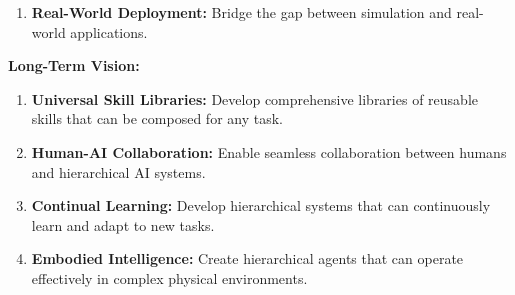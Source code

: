 \documentclass[12pt]{article}
\begin{document}
{{\begin{enumerate}
    \item \textbf{Real-World Deployment:} Bridge the gap between simulation and real-world applications.
\end{enumerate}

\textbf{Long-Term Vision:}
    \begin{enumerate}
    \item \textbf{Universal Skill Libraries:} Develop comprehensive libraries of reusable skills that can be composed for any task.
    
    \item \textbf{Human-AI Collaboration:} Enable seamless collaboration between humans and hierarchical AI systems.
    
    \item \textbf{Continual Learning:} Develop hierarchical systems that can continuously learn and adapt to new tasks.
    
    \item \textbf{Embodied Intelligence:} Create hierarchical agents that can operate effectively in complex physical environments.
\end{enumerate}


}}


\newpage
\end{document}
